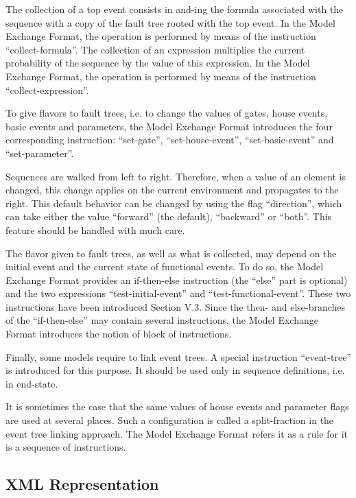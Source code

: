 \documentclass[11pt]{article}
\begin{document}
The collection of a top event consists in and-ing the formula associated
with the sequence with a copy of the fault tree rooted with the top
event. In the Model Exchange Format, the operation is performed by means
of the instruction ``collect-formula''. The collection of an expression
multiplies the current probability of the sequence by the value of this
expression. In the Model Exchange Format, the operation is performed by
means of the instruction ``collect-expression''.

To give flavors to fault trees, i.e. to change the values of gates,
house events, basic events and parameters, the Model Exchange Format
introduces the four corresponding instruction: ``set-gate'',
``set-house-event'', ``set-basic-event'' and ``set-parameter''.

Sequences are walked from left to right. Therefore, when a value of an
element is changed, this change applies on the current environment and
propagates to the right. This default behavior can be changed by using
the flag ``direction'', which can take either the value ``forward'' (the
default), ``backward'' or ``both''. This feature should be handled with much
care.

The flavor given to fault trees, as well as what is collected, may
depend on the initial event and the current state of functional events.
To do so, the Model Exchange Format provides an if-then-else instruction
(the ``else'' part is optional) and the two expressions
``test-initial-event'' and ``test-functional-event''. These two instructions
have been introduced Section V.3. Since the then- and else-branches of
the ``if-then-else'' may contain several instructions, the Model Exchange
Format introduces the notion of block of instructions.

Finally, some models require to link event trees. A special instruction
``event-tree'' is introduced for this purpose. It should be used only in
sequence definitions, i.e. in end-state.

It is sometimes the case that the same values of house events and
parameter flags are used at several places. Such a configuration is
called a split-fraction in the event tree linking approach. The Model
Exchange Format refers it as a rule for it is a sequence of
instructions.

\subsection{XML Representation}
\label{sec:org9b245aa}
\end{document}
